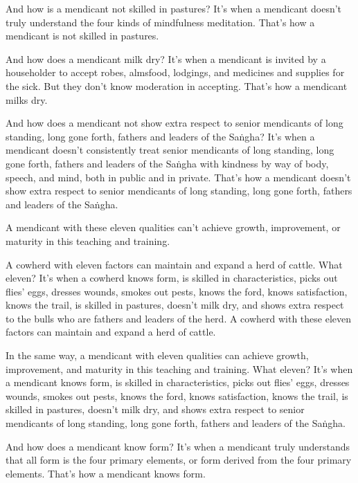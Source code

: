 \documentclass[12pt,openany]{book}%
\begin{document}
And how is a mendicant not skilled in pastures? It’s when a mendicant doesn’t truly understand the four kinds of mindfulness meditation. That’s how a mendicant is not skilled in pastures. 

And how does a mendicant milk dry? It’s when a mendicant is invited by a householder to accept robes, almsfood, lodgings, and medicines and supplies for the sick. But they don’t know moderation in accepting. That’s how a mendicant milks dry. 

And how does a mendicant not show extra respect to senior mendicants of long standing, long gone forth, fathers and leaders of the \textsanskrit{Saṅgha}? It’s when a mendicant doesn’t consistently treat senior mendicants of long standing, long gone forth, fathers and leaders of the \textsanskrit{Saṅgha} with kindness by way of body, speech, and mind, both in public and in private. That’s how a mendicant doesn’t show extra respect to senior mendicants of long standing, long gone forth, fathers and leaders of the \textsanskrit{Saṅgha}. 

A mendicant with these eleven qualities can’t achieve growth, improvement, or maturity in this teaching and training. 

A cowherd with eleven factors can maintain and expand a herd of cattle. What eleven? It’s when a cowherd knows form, is skilled in characteristics, picks out flies’ eggs, dresses wounds, smokes out pests, knows the ford, knows satisfaction, knows the trail, is skilled in pastures, doesn’t milk dry, and shows extra respect to the bulls who are fathers and leaders of the herd. A cowherd with these eleven factors can maintain and expand a herd of cattle. 

In the same way, a mendicant with eleven qualities can achieve growth, improvement, and maturity in this teaching and training. What eleven? It’s when a mendicant knows form, is skilled in characteristics, picks out flies’ eggs, dresses wounds, smokes out pests, knows the ford, knows satisfaction, knows the trail, is skilled in pastures, doesn’t milk dry, and shows extra respect to senior mendicants of long standing, long gone forth, fathers and leaders of the \textsanskrit{Saṅgha}. 

And how does a mendicant know form? It’s when a mendicant truly understands that all form is the four primary elements, or form derived from the four primary elements. That’s how a mendicant knows form. 
\end{document}
